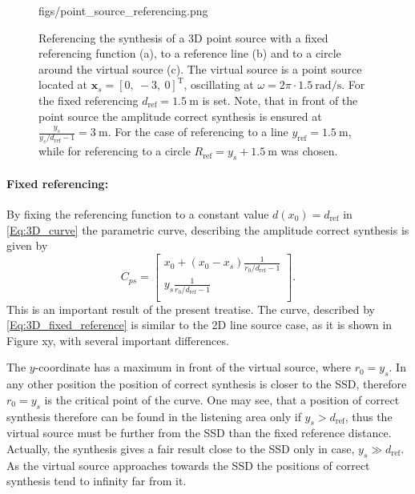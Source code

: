 \documentclass[12pt,a4paper]{article}
\newcommand{\yref}{y_{\mathrm{ref}}}
\newcommand{\dref}{d_{\mathrm{ref}}}
\begin{document}
\begin{figure}
	\centering
	\begin{overpic}[width = 1\columnwidth ]{figs/point_source_referencing.png}
	\scriptsize
	\end{overpic}
\caption{Referencing the synthesis of a 3D point source with a fixed referencing function (a), to a reference line (b) and to a circle around the virtual source (c). The virtual source is a point source located at $\mathbf{x}_s = [0,\ -3,\ 0]^{\mathrm{T}}$, oscillating at $\omega = 2\pi \cdot 1.5 ~\mathrm{rad/s}$. For the fixed referencing $\dref = 1.5~\mathrm{m}$ is set. Note, that in front of the point source the amplitude correct synthesis is ensured at $\frac{y_s}{y_s/\dref - 1 } = 3~\mathrm{m}$. For the case of referencing to a line $\yref = 1.5~\mathrm{m}$, while for referencing to a circle $R_{\mathrm{ref}} = y_s + 1.5~\mathrm{m}$ was chosen.}
	\label{Fig:Theory:point_source_referencing}
\end{figure}

\paragraph{Fixed referencing:\\}
By fixing the referencing function to a constant value $d(x_0) = \dref$ in \eqref{Eq:3D_curve} the parametric curve, describing the amplitude correct synthesis is given by
\begin{equation}
C_{ps} =  \begin{bmatrix} x_0 + (x_0-x_s)\frac{1}{r_0/\dref - 1 } \\[0.3em] y_s \frac{1}{r_0/\dref - 1}\\[0.3em]    \end{bmatrix}.
\label{Eq:3D_fixed_reference}
\end{equation}
This is an important result of the present treatise. The curve, described by \eqref{Eq:3D_fixed_reference} is similar to the 2D line source case, as it is shown in Figure xy, with several important differences.

The $y$-coordinate has a maximum in front of the virtual source, where $r_0 = y_s$. In any other position the position of correct synthesis is closer to the SSD, therefore $r_0 = y_s$ is the critical point of the curve. One may see, that a position of correct synthesis therefore can be found in the listening area only if $y_s > \dref$, thus the virtual source must be further from the SSD than the fixed reference distance. Actually, the synthesis gives a fair result close to the SSD only in case, $y_s \gg \dref$. As the virtual source approaches towards the SSD the positions of correct synthesis tend to infinity far from it.
\end{document}
